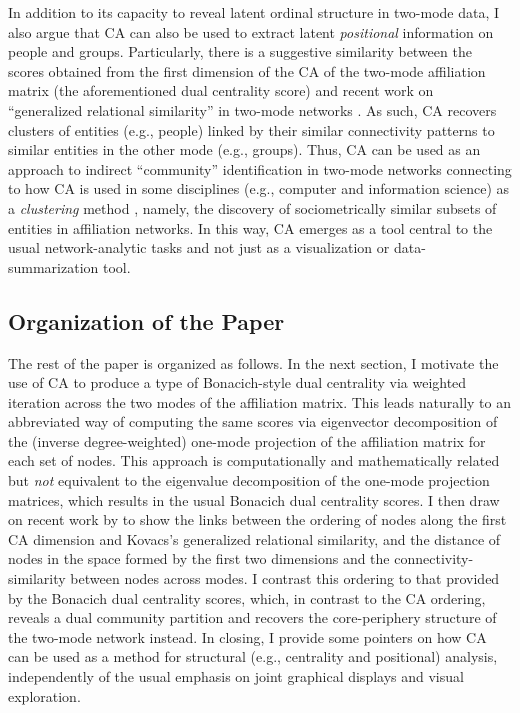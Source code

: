 \documentclass[a4paper,fleqn]{cas-sc}
\begin{document}
In addition to its capacity to reveal latent ordinal structure in two-mode data, I also argue that CA can also be used to extract latent \textit{positional} information on people and groups. Particularly, there is a suggestive similarity between the scores obtained from the first dimension of the CA of the two-mode affiliation matrix (the aforementioned dual centrality score) and recent work on ``generalized relational similarity'' in two-mode networks \citep{kovacs2010generalized, lizardo2024two}. As such, CA recovers clusters of entities (e.g., people) linked by their similar connectivity patterns to similar entities in the other mode (e.g., groups). Thus, CA can be used as an approach to indirect ``community'' identification in two-mode networks connecting to how CA is used in some disciplines (e.g., computer and information science) as a \textit{clustering} method \citep{zha2001bipartite}, namely, the discovery of sociometrically similar subsets of entities in affiliation networks. In this way, CA emerges as a tool central to the usual network-analytic tasks and not just as a visualization or data-summarization tool.

\subsection{Organization of the Paper} \label{subsec:org}
The rest of the paper is organized as follows. In the next section, I motivate the use of CA to produce a type of Bonacich-style dual centrality via weighted iteration across the two modes of the affiliation matrix. This leads naturally to an abbreviated way of computing the same scores via eigenvector decomposition of the (inverse degree-weighted) one-mode projection of the affiliation matrix for each set of nodes. This approach is computationally and mathematically related but \textit{not} equivalent to the eigenvalue decomposition of the one-mode projection matrices, which results in the usual Bonacich dual centrality scores. I then draw on recent work by \citet{van2021correspondence} to show the links between the ordering of nodes along the first CA dimension and Kovacs's generalized relational similarity, and the distance of nodes in the space formed by the first two dimensions and the connectivity-similarity between nodes across modes. I contrast this ordering to that provided by the Bonacich dual centrality scores, which, in contrast to the CA ordering, reveals a dual community partition and recovers the core-periphery structure of the two-mode network instead. In closing, I provide some pointers on how CA can be used as a method for structural (e.g., centrality and positional) analysis, independently of the usual emphasis on joint graphical displays and visual exploration. 
\end{document}
